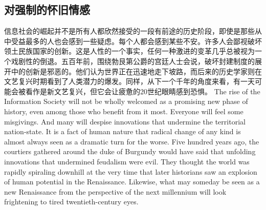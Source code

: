 \subsection{对强制的怀旧情感}
\begin{paracol}{2}[]
信息社会的崛起并不是所有人都欣然接受的一段有前途的历史阶段，即使是那些从中受益最多的人也会感到一些疑虑。每个人都会感到某些不安。许多人会鄙视破坏领土民族国家的创新。这是人性的一个事实，任何一种激进的变革几乎总被视为一个戏剧性的倒退。五百年前，围绕勃艮第公爵的宫廷人士会说，破坏封建制度的展开中的创新是邪恶的。他们认为世界正在迅速地走下坡路，而后来的历史学家则在文艺复兴时期看到了人类潜力的爆发。同样，从下一个千年的角度来看，有一天可能会被看作是新文艺复兴，但它会让疲惫的20世纪眼睛感到恐惧。
\switchcolumn
The rise of the Information Society will not be wholly welcomed as a promising new phase of history, even among those who benefit from it most. Everyone will feel some misgivings. And many will despise innovations that undermine the territorial nation-state. It is a fact of human nature that radical change of any kind is almost always seen as a dramatic turn for the worse. Five hundred years ago, the courtiers gathered around the duke of Burgundy would have said that unfolding innovations that undermined feudalism were evil. They thought the world was rapidly spiraling downhill at the very time that later historians saw an explosion of human potential in the Renaissance. Likewise, what may someday be seen as a new Renaissance from the perspective of the next millennium will look frightening to tired twentieth-century eyes.


\end{paracol}
